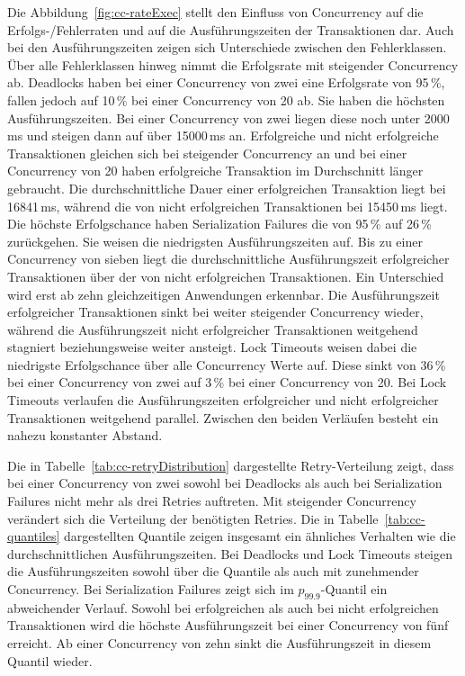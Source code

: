
Die Abbildung~\ref{fig:cc-rateExec} stellt den Einfluss von Concurrency auf die Erfolgs-/Fehlerraten und auf die
Ausführungszeiten der Transaktionen dar.
Auch bei den Ausführungszeiten zeigen sich Unterschiede zwischen den Fehlerklassen.
Über alle Fehlerklassen hinweg nimmt die Erfolgsrate mit steigender Concurrency ab.
Deadlocks haben bei einer Concurrency von zwei eine Erfolgsrate von 95\,\%, fallen jedoch auf 10\,\% bei einer Concurrency
von 20 ab.
Sie haben die höchsten Ausführungszeiten.
Bei einer Concurrency von zwei liegen diese noch unter 2000\,ms und steigen dann auf über 15000\,ms an.
Erfolgreiche und nicht erfolgreiche Transaktionen gleichen sich bei steigender Concurrency an und bei einer Concurrency
von 20 haben erfolgreiche Transaktion im Durchschnitt länger gebraucht.
Die durchschnittliche Dauer einer erfolgreichen Transaktion liegt bei 16841\,ms, während die von nicht erfolgreichen
Transaktionen bei 15450\,ms liegt.
Die höchste Erfolgschance haben Serialization Failures die von 95\,\% auf 26\,\% zurückgehen.
Sie weisen die niedrigsten Ausführungszeiten auf.
Bis zu einer Concurrency von sieben liegt die durchschnittliche Ausführungszeit erfolgreicher Transaktionen über der
von nicht erfolgreichen Transaktionen.
Ein Unterschied wird erst ab zehn gleichzeitigen Anwendungen erkennbar.
Die Ausführungszeit erfolgreicher Transaktionen sinkt bei weiter steigender Concurrency wieder, während die
Ausführungszeit nicht erfolgreicher Transaktionen weitgehend stagniert beziehungsweise weiter ansteigt.
Lock Timeouts weisen dabei die niedrigste Erfolgschance über alle Concurrency Werte auf.
Diese sinkt von 36\,\% bei einer Concurrency von zwei auf 3\,\% bei einer Concurrency von 20.
Bei Lock Timeouts verlaufen die Ausführungszeiten erfolgreicher und nicht erfolgreicher Transaktionen weitgehend
parallel.
Zwischen den beiden Verläufen besteht ein nahezu konstanter Abstand.



Die in Tabelle~\ref{tab:cc-retryDistribution} dargestellte Retry-Verteilung zeigt, dass bei einer Concurrency von zwei
sowohl bei Deadlocks als auch bei Serialization Failures nicht mehr als drei Retries auftreten.
Mit steigender Concurrency verändert sich die Verteilung der benötigten Retries.
Die in Tabelle~\ref{tab:cc-quantiles} dargestellten Quantile zeigen insgesamt ein ähnliches Verhalten wie die
durchschnittlichen Ausführungszeiten.
Bei Deadlocks und Lock Timeouts steigen die Ausführungszeiten sowohl über die Quantile als auch mit zunehmender
Concurrency.
Bei Serialization Failures zeigt sich im $p_{99.9}$-Quantil ein abweichender Verlauf.
Sowohl bei erfolgreichen als auch bei nicht erfolgreichen Transaktionen wird die höchste Ausführungszeit bei einer
Concurrency von fünf erreicht.
Ab einer Concurrency von zehn sinkt die Ausführungszeit in diesem Quantil wieder.

